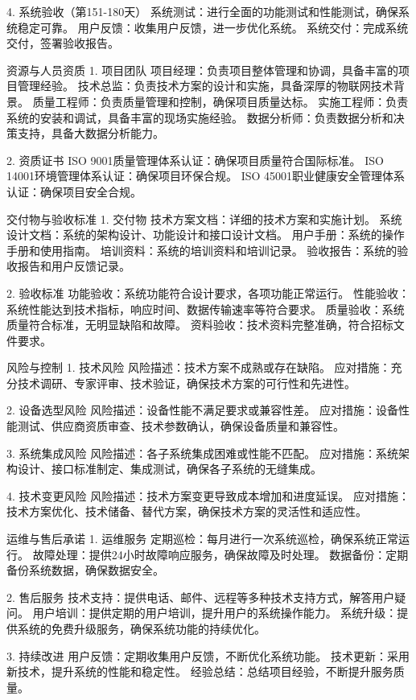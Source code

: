 \documentclass[12pt,a4paper]{article}
\begin{document}
\begin{itemize}
\begin{itemize}
\begin{itemize}
\begin{itemize}
\begin{itemize}
\begin{itemize}
\begin{itemize}
\begin{itemize}
\begin{itemize}
\begin{itemize}
\begin{itemize}
4. 系统验收（第151-180天）
系统测试：进行全面的功能测试和性能测试，确保系统稳定可靠。
用户反馈：收集用户反馈，进一步优化系统。
系统交付：完成系统交付，签署验收报告。

资源与人员资质
1. 项目团队
项目经理：负责项目整体管理和协调，具备丰富的项目管理经验。
技术总监：负责技术方案的设计和实施，具备深厚的物联网技术背景。
质量工程师：负责质量管理和控制，确保项目质量达标。
实施工程师：负责系统的安装和调试，具备丰富的现场实施经验。
数据分析师：负责数据分析和决策支持，具备大数据分析能力。

2. 资质证书
ISO 9001质量管理体系认证：确保项目质量符合国际标准。
ISO 14001环境管理体系认证：确保项目环保合规。
ISO 45001职业健康安全管理体系认证：确保项目安全合规。

交付物与验收标准
1. 交付物
技术方案文档：详细的技术方案和实施计划。
系统设计文档：系统的架构设计、功能设计和接口设计文档。
用户手册：系统的操作手册和使用指南。
培训资料：系统的培训资料和培训记录。
验收报告：系统的验收报告和用户反馈记录。

2. 验收标准
功能验收：系统功能符合设计要求，各项功能正常运行。
性能验收：系统性能达到技术指标，响应时间、数据传输速率等符合要求。
质量验收：系统质量符合标准，无明显缺陷和故障。
资料验收：技术资料完整准确，符合招标文件要求。

风险与控制
1. 技术风险
风险描述：技术方案不成熟或存在缺陷。
应对措施：充分技术调研、专家评审、技术验证，确保技术方案的可行性和先进性。

2. 设备选型风险
风险描述：设备性能不满足要求或兼容性差。
应对措施：设备性能测试、供应商资质审查、技术参数确认，确保设备质量和兼容性。

3. 系统集成风险
风险描述：各子系统集成困难或性能不匹配。
应对措施：系统架构设计、接口标准制定、集成测试，确保各子系统的无缝集成。

4. 技术变更风险
风险描述：技术方案变更导致成本增加和进度延误。
应对措施：技术方案优化、技术储备、替代方案，确保技术方案的灵活性和适应性。

运维与售后承诺
1. 运维服务
定期巡检：每月进行一次系统巡检，确保系统正常运行。
故障处理：提供24小时故障响应服务，确保故障及时处理。
数据备份：定期备份系统数据，确保数据安全。

2. 售后服务
技术支持：提供电话、邮件、远程等多种技术支持方式，解答用户疑问。
用户培训：提供定期的用户培训，提升用户的系统操作能力。
系统升级：提供系统的免费升级服务，确保系统功能的持续优化。

3. 持续改进
用户反馈：定期收集用户反馈，不断优化系统功能。
技术更新：采用新技术，提升系统的性能和稳定性。
经验总结：总结项目经验，不断提升服务质量。


\end{itemize}
\end{itemize}
\end{itemize}
\end{itemize}
\end{itemize}
\end{itemize}
\end{itemize}
\end{itemize}
\end{itemize}
\end{itemize}
\end{itemize}
\end{document}
